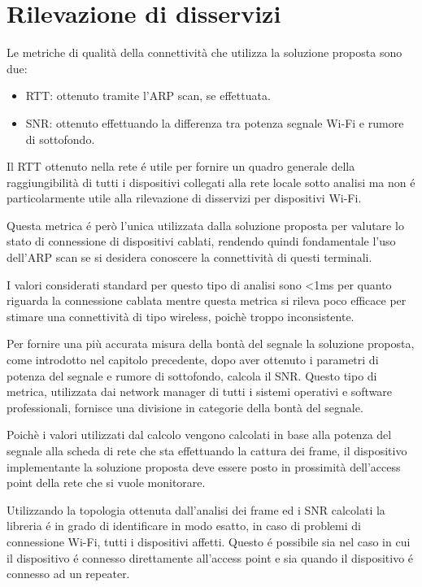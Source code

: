 \newpage 

\section{Rilevazione di disservizi}

Le metriche di qualit\`a della connettivit\`a  che utilizza la soluzione proposta sono due:
\begin{itemize}
	\item RTT: ottenuto tramite l'ARP scan, se effettuata.
	\item SNR: ottenuto effettuando la differenza tra potenza segnale Wi-Fi e rumore di sottofondo.
\end{itemize}

Il RTT ottenuto nella rete \'e utile per fornire un quadro generale della raggiungibilit\`a di tutti i dispositivi collegati alla rete locale sotto analisi ma non \'e particolarmente utile alla rilevazione di disservizi per dispositivi Wi-Fi.

Questa metrica \'e per\`o l'unica utilizzata dalla soluzione proposta per valutare lo stato di connessione di dispositivi cablati, rendendo quindi fondamentale l'uso dell'ARP scan se si desidera conoscere la connettivit\`a di questi terminali.

I valori considerati standard per questo tipo di analisi sono <1ms per quanto riguarda la connessione cablata mentre questa metrica si rileva poco efficace per stimare una connettivit\`a di tipo wireless, poich\`e troppo inconsistente.

Per fornire una pi\`u accurata misura della bont\`a del segnale la soluzione proposta, come introdotto nel capitolo precedente, dopo aver ottenuto i parametri di potenza del segnale e rumore di sottofondo, calcola il SNR.
Questo tipo di metrica, utilizzata dai network manager di tutti i sistemi operativi e software professionali, fornisce una divisione in categorie della bont\`a del segnale.

Poich\`e i valori utilizzati dal calcolo vengono calcolati in base alla potenza del segnale alla scheda di rete che sta effettuando la cattura dei frame, il dispositivo implementante la soluzione proposta deve essere posto in prossimit\`a dell'access point della rete che si vuole monitorare.

Utilizzando la topologia ottenuta dall'analisi dei frame ed i SNR calcolati la libreria \'e in grado di identificare in modo esatto, in caso di problemi di connessione Wi-Fi, tutti i dispositivi affetti.
Questo \'e possibile sia nel caso in cui il dispositivo \'e connesso direttamente all'access point e sia quando il dispositivo \'e connesso ad un repeater.

